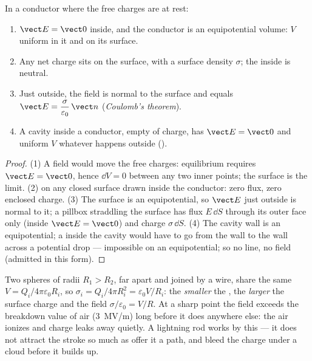 \begin{theorem}\label{thm:b1:potential-capacitors:conductor}
In a conductor where the free charges are at rest:
\begin{enumerate}
  \item $\vect E = \vect 0$ inside, and the conductor is an equipotential
        volume: $V$ uniform in it and on its surface.
  \item Any net charge sits on the surface, with a surface density
        $\sigma$; the inside is neutral.
  \item Just outside, the field is normal to the surface and equals
        $\vect E = \dfrac{\sigma}{\varepsilon_0}\,\vect n$ (\emph{Coulomb's theorem}).
  \item A cavity inside a conductor, empty of charge, has $\vect E =
        \vect 0$ and uniform $V$ whatever happens outside (\emph{}).
\end{enumerate}
\end{theorem}

\begin{proof}
(1) A field would move the free charges: equilibrium requires $\vect E =
\vect 0$, hence $\dd V = 0$ between any two inner points; the surface is
the limit. (2)  on any closed surface drawn inside the
conductor: zero flux, zero enclosed charge. (3) The surface is an
equipotential, so $\vect E$ just outside is normal to it; a pillbox
straddling the surface has flux $E\,\dd S$ through its outer face only
(inside $\vect E = \vect 0$) and charge $\sigma\,\dd S$. (4) The cavity
wall is an equipotential; a  inside the cavity would have to
go from the wall to the wall across a potential drop --- impossible on
an equipotential; so no line, no field (admitted in this form).
\end{proof}

\begin{example}\label{ex:b1:potential-capacitors:point}
Two spheres of radii $R_1 > R_2$, far apart and joined by a wire, share
the same $V = Q_i/4\pi\varepsilon_0R_i$, so $\sigma_i = Q_i/4\pi R_i^2 = \varepsilon_0V/R_i$:
the \emph{smaller} the , the \emph{larger} the surface
charge and the field $\sigma/\varepsilon_0 = V/R$. At a sharp point the field
exceeds the breakdown value of air (\qty{3}{MV/m}) long before it does
anywhere else: the air ionizes and charge leaks away quietly. A
lightning rod works by this \emph{} --- it does not attract
the stroke so much as offer it a path, and bleed the charge under a
cloud before it builds up.
\end{example}

